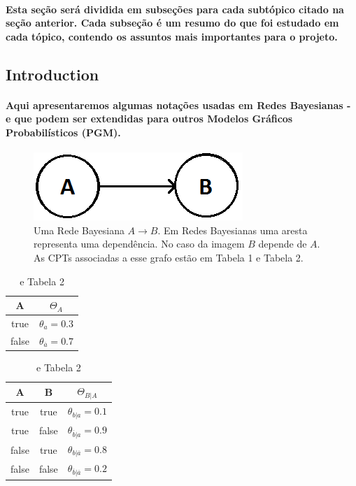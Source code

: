 \documentclass[a4paper,10pt]{article}
\theoremstyle{plain}
\begin{document}
\paragraph{
  Esta seção será dividida em subseções para cada subtópico citado na seção anterior. Cada 
subseção é um resumo do que foi estudado em cada tópico, contendo os assuntos mais importantes
para o projeto.
}

\subsection{Introduction}

\paragraph{
  Aqui apresentaremos algumas notações usadas em Redes Bayesianas - e que podem ser extendidas para
outros Modelos Gráficos Probabilísticos (PGM).
}

\begin{figure}[h]
\centering\includegraphics[scale=0.5]{imgs/fig1.png}
\caption{Uma Rede Bayesiana $A \to B$. Em Redes Bayesianas uma aresta representa uma dependência.
  No caso da imagem $B$ depende de $A$. As CPTs associadas a esse grafo estão em Tabela 1 e 
  Tabela 2.}
\end{figure}

\begin{table}[h]
\begin{center}
\captionsetup{justification=centering}
\caption{ e Tabela 2}
\begin{tabular}{c | c}
  A  & $\Theta_A$ \\
\hline
true & $\theta_a = 0.3$ \\
false& $\theta_{\overline{a}} = 0.7$ \\
\end{tabular}
\quad
\quad
\begin{tabular}{c c | c}
A & B & $\Theta_{B|A}$ \\
\hline
true & true & $\theta_{b|a} = 0.1$ \\
true & false & $\theta_{\overline{b}|a} = 0.9$ \\
false & true & $\theta_{b|\overline{a}} = 0.8$ \\
false & false & $\theta_{\overline{b}|\overline{a}} = 0.2$ \\
\end{tabular}
\end{center}
\end{table}
\end{document}
